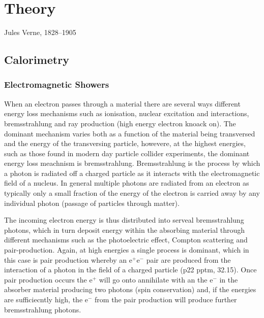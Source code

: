 \chapter{Theory}
\label{chap:theory}

{Jules Verne, 1828--1905}

\section{Calorimetry}

\subsection{Electromagnetic Showers}
When an electron passes through a material there are several ways different energy loss mechanisms such as ionisation, nuclear excitation and interactions, bremsstrahlung and \delta ray production (high energy electron knoack on).  The dominant mechanism varies both as a function of the material being transversed and the energy of the transversing particle, howevere, at the highest energies, such as those found in modern day particle collider experiments, the dominant energy loss meachnism is bremsstrahlung.  Bremsstrahlung is the process by which a photon is radiated off a charged particle as it interacts with the electromagnetic field of a nucleus.  In general multiple photons are radiated from an electron as typically only a small fraction of the energy of the electron is carried away by any individual photon (passage of particles through matter). 

The incoming electron energy is thus distributed into serveal bremsstrahlung photons, which in turn deposit energy within the absorbing material through different mechanisms such as the photoelectric effect, Compton scattering and pair-production.  Again, at high energies a single process is dominant, which in this case is pair production whereby an $\text{e}^{+}\text{e}^{-}$ pair are produced from the interaction of a photon in the field of a charged particle (p22 pptm, 32.15).  Once pair production occurs the $\text{e}^{+}$ will go onto annihilate with an the $\text{e}^{-}$ in the absorber material producing two photons (spin conservation) and, if the energies are sufficiecntly high, the $\text{e}^{-}$ from the pair production will produce further bremsstrahlung photons.  


